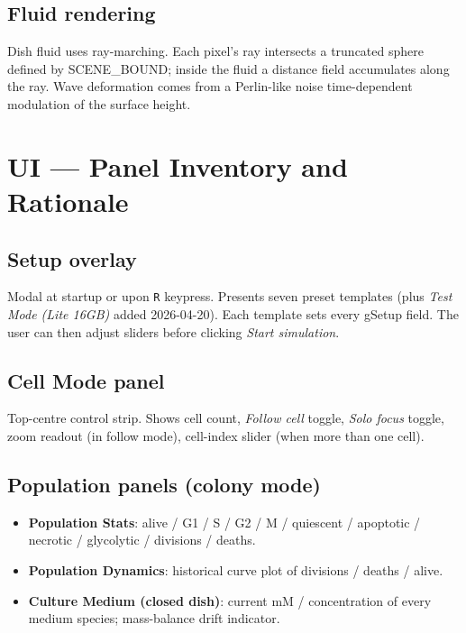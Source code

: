\documentclass[11pt,letterpaper,twoside,openany]{book}
\begin{document}
\section{Fluid rendering}

Dish fluid uses ray-marching. Each pixel's ray intersects a
truncated sphere defined by SCENE\_BOUND; inside the fluid a
distance field accumulates along the ray. Wave deformation comes
from a Perlin-like noise time-dependent modulation of the surface
height.

\chapter{UI --- Panel Inventory and Rationale}
\label{ch:ui-deep}

\section{Setup overlay}

Modal at startup or upon \texttt{R} keypress. Presents seven preset
templates (plus \emph{Test Mode (Lite 16GB)} added 2026-04-20).
Each template sets every gSetup field. The user can then adjust
sliders before clicking \emph{Start simulation}.

\section{Cell Mode panel}

Top-centre control strip. Shows cell count, \emph{Follow cell}
toggle, \emph{Solo focus} toggle, zoom readout (in follow mode),
cell-index slider (when more than one cell).

\section{Population panels (colony mode)}

\begin{itemize}
  \item \textbf{Population Stats}: alive / G1 / S / G2 / M /
        quiescent / apoptotic / necrotic / glycolytic / divisions /
        deaths.
  \item \textbf{Population Dynamics}: historical curve plot of
        divisions / deaths / alive.
  \item \textbf{Culture Medium (closed dish)}: current mM /
        concentration of every medium species; mass-balance drift
        indicator.
\end{itemize}
\end{document}
